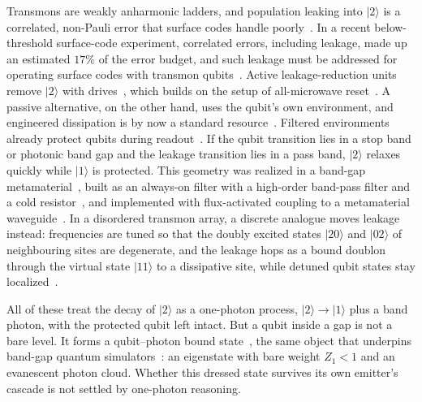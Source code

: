 \documentclass[aps,prresearch,twocolumn,superscriptaddress,nofootinbib,longbibliography,floatfix]{revtex4-2}
\begin{document}
Transmons are weakly anharmonic ladders, and population leaking into $|2\rangle$ is a correlated, non-Pauli error that
surface codes handle poorly~\cite{Battistel2021,Miao2023,Acharya2024}. In a recent below-threshold surface-code
experiment, correlated errors, including leakage, made up an estimated $17\%$ of the error budget, and such leakage must be addressed for operating surface codes with transmon qubits~\cite{Acharya2024}. Active
leakage-reduction units remove $|2\rangle$ with drives~\cite{Battistel2021,Marques2023,Lacroix2025,Yang2024}, which builds on the setup of 
all-microwave reset~\cite{Magnard2018}. A passive alternative, on the other hand, uses the qubit's own environment, and engineered dissipation is
by now a standard resource~\cite{Harrington2022,Harrington2019}. Filtered environments already protect qubits
during readout~\cite{Sete2015}. If the qubit transition lies in a stop band or photonic band gap and the
leakage transition lies in a pass band, $|2\rangle$ relaxes quickly while $|1\rangle$ is protected. This geometry was
realized in a band-gap metamaterial~\cite{Mirhosseini2018}, built as an always-on filter with a high-order band-pass
filter and a cold resistor~\cite{Thorbeck2024}, and implemented with flux-activated coupling to a metamaterial
waveguide~\cite{Kim2025}. In a disordered transmon array, a discrete analogue moves leakage instead: frequencies are tuned so that the
doubly excited states $|20\rangle$ and $|02\rangle$ of neighbouring sites are degenerate, and the leakage hops as a
bound doublon through the virtual state $|11\rangle$ to a dissipative site, while detuned qubit states stay
localized~\cite{MartinVazquez2025,Tolppanen2026}.

All of these treat the decay of $|2\rangle$ as a one-photon process, $|2\rangle\to|1\rangle$ plus a band photon, with the
protected qubit left intact. But a qubit inside a gap is not a bare level. It forms a qubit--photon bound
state~\cite{JohnWang1990,JohnQuang1994,KofmanKurizkiSherman1994,Lambropoulos2000RPP,LiuHouck2017,Sundaresan2019,Ferreira2021,Scigliuzzo2022,Sheremet2023},
the same object that underpins band-gap quantum simulators~\cite{Zhang2023}: an eigenstate with bare weight
$Z_1<1$ and an evanescent photon cloud. Whether this dressed state survives its own emitter's cascade is not settled by
one-photon reasoning.
\end{document}
